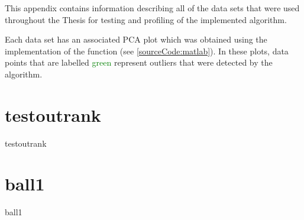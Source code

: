 This appendix contains information describing all of the data sets that were
used throughout the Thesis for testing and profiling of the implemented
algorithm.

Each data set has an associated \gls{PCA} plot which was obtained using the
 implementation of the 
function (see \autoref{sourceCode:matlab}). In these plots, data points that are
labelled \textcolor{green}{green} represent outliers that were detected by the
algorithm.

\section{testoutrank}
\label{datasets:testoutrank}
\begin{datasetDescription}{testoutrank}
\end{datasetDescription}

\section{ball1}
\label{datasets:ball1}
\begin{datasetDescription}{ball1}
\end{datasetDescription}

